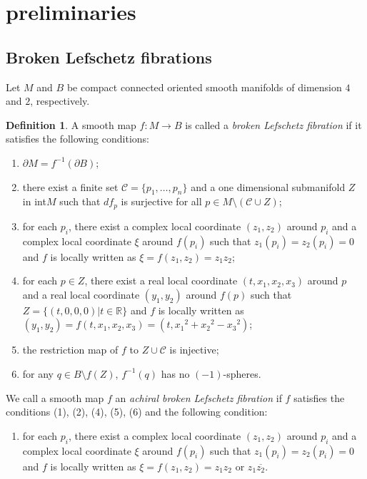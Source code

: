 \documentclass{amsart}
\theoremstyle{plain}
\theoremstyle{definition}
\newtheorem{defn}[thm]{Definition}
\begin{document}
\section{preliminaries}

\subsection{Broken Lefschetz fibrations}

Let $M$ and $B$ be compact connected oriented smooth manifolds of dimension $4$ and $2$, respectively. 

\begin{defn}

A smooth map $f:M\rightarrow B$ is called a {\it broken Lefschetz fibration} if it satisfies the following conditions: 

\begin{enumerate}[(1)]

\item $\partial M=f^{-1}(\partial B)$; 

\item there exist a finite set $\mathcal{C}=\{p_1,\ldots,p_n\}$ and a one dimensional submanifold $Z$ in int$M$ such that 
$df_p$ is surjective for all $p\in M\setminus(\mathcal{C}\cup Z)$; 

\item for each $p_i$, there exist a complex local coordinate $(z_1,z_2)$ around $p_i$ and a complex local coordinate $\xi$ around $f(p_i)$ such that 
$z_1(p_i)=z_2(p_i)=0$ and $f$ is locally written as $\xi=f(z_1,z_2)=z_1z_2$; 

\item for each $p\in Z$, there exist a real local coordinate $(t,x_1,x_2,x_3)$ around $p$ and a real local coordinate $(y_1,y_2)$ around $f(p)$ such that 
$Z=\{(t,0,0,0)|t\in\mathbb{R}\}$ and $f$ is locally written as $(y_1,y_2)=f(t,x_1,x_2,x_3)=(t,{x_1}^2+{x_2}^2-{x_3}^2)$; 

\item the restriction map of $f$ to $Z\cup\mathcal{C}$ is injective; 

\item for any $q\in B\setminus f(Z)$, $f^{-1}(q)$ has no $(-1)$-spheres. 

\end{enumerate}

We call a smooth map $f$ an {\it achiral broken Lefschetz fibration} if $f$ satisfies the conditions (1), (2), (4), (5), (6) and the following condition: 

\begin{enumerate}[(3)$^\prime$]

\item for each $p_i$, there exist a complex local coordinate $(z_1,z_2)$ around $p_i$ and a complex local coordinate $\xi$ around $f(p_i)$ such that 
$z_1(p_i)=z_2(p_i)=0$ and $f$ is locally written as $\xi=f(z_1,z_2)=z_1z_2$ or $z_1\overline{z_2}$. 

\end{enumerate}

\end{defn}
\end{document}
